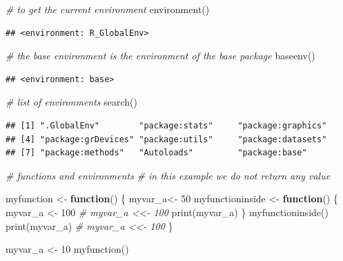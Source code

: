 \documentclass[
]{book}
\newenvironment{Shaded}{\begin{snugshade}}{\end{snugshade}}
\newcommand{\CommentTok}[1]{\textcolor[rgb]{0.56,0.35,0.01}{\textit{#1}}}
\newcommand{\ControlFlowTok}[1]{\textcolor[rgb]{0.13,0.29,0.53}{\textbf{#1}}}
\newcommand{\DecValTok}[1]{\textcolor[rgb]{0.00,0.00,0.81}{#1}}
\newcommand{\FunctionTok}[1]{\textcolor[rgb]{0.00,0.00,0.00}{#1}}
\newcommand{\NormalTok}[1]{#1}
\newcommand{\OtherTok}[1]{\textcolor[rgb]{0.56,0.35,0.01}{#1}}
\begin{document}
\begin{Shaded}
\begin{Highlighting}[]
\CommentTok{\# to get the current environment}
\FunctionTok{environment}\NormalTok{()}
\end{Highlighting}
\end{Shaded}

\begin{verbatim}
## <environment: R_GlobalEnv>
\end{verbatim}

\begin{Shaded}
\begin{Highlighting}[]
\CommentTok{\# the base environment is the environment of the base package}
\FunctionTok{baseenv}\NormalTok{()}
\end{Highlighting}
\end{Shaded}

\begin{verbatim}
## <environment: base>
\end{verbatim}

\begin{Shaded}
\begin{Highlighting}[]
\CommentTok{\# list of environments}
\FunctionTok{search}\NormalTok{()}
\end{Highlighting}
\end{Shaded}

\begin{verbatim}
## [1] ".GlobalEnv"        "package:stats"     "package:graphics" 
## [4] "package:grDevices" "package:utils"     "package:datasets" 
## [7] "package:methods"   "Autoloads"         "package:base"
\end{verbatim}

\begin{Shaded}
\begin{Highlighting}[]
\CommentTok{\# functions and environments }
\CommentTok{\# in this example we do not return any value }

\NormalTok{myfunction }\OtherTok{\textless{}{-}} \ControlFlowTok{function}\NormalTok{() \{}
\NormalTok{  myvar\_a}\OtherTok{\textless{}{-}} \DecValTok{50}
\NormalTok{  myfunctioninside }\OtherTok{\textless{}{-}} \ControlFlowTok{function}\NormalTok{() \{}
\NormalTok{  myvar\_a }\OtherTok{\textless{}{-}} \DecValTok{100}
  \CommentTok{\# myvar\_a \textless{}\textless{}{-} 100}
  \FunctionTok{print}\NormalTok{(myvar\_a)}
\NormalTok{  \}}
  \FunctionTok{myfunctioninside}\NormalTok{()}
  \FunctionTok{print}\NormalTok{(myvar\_a)}
  \CommentTok{\# myvar\_a \textless{}\textless{}{-} 100}
\NormalTok{\}}

\NormalTok{myvar\_a }\OtherTok{\textless{}{-}} \DecValTok{10}
\FunctionTok{myfunction}\NormalTok{()}
\end{Highlighting}
\end{Shaded}
\end{document}
